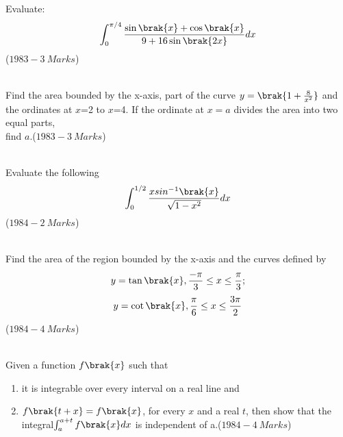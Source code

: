 \iffalse
  \title{Assignment}
  \author{Satyanarayana Gajjarapu}
  \section{subjective}
\fi

    \item Evaluate:\begin{align*}
         \int_{0}^{\pi/4}\frac{\sin{\brak{x}}+\cos{\brak{x}}}{9+16\sin{\brak{2x}}}dx\end{align*} \hfill($1983-3\ Marks$)\\\\
	 \item Find the area bounded by the x-axis, part of the curve $y=\brak{1+\frac{8}{x^2}}$ and the ordinates at $x$=2 to $x$=4. If the ordinate at $x=a$ divides the area into two equal parts,\\ find $a$.\hfill($1983-3\ Marks$)\\\\
	 \item Evaluate the following\begin{align*}
	     \int_{0}^{1/2}\frac{xsin^-{}^1\brak{x}}{\sqrt{1-x^2}}dx
	     \end{align*}\hfill($1984-2\ Marks$)\\\\
     \item Find the area of the region bounded by the x-axis and the curves defined by \begin{align*}y=\tan{\brak{x}}, \frac{-\pi}{3}\leq x \leq\frac{\pi}{3};\end{align*}\begin{align*}y=\cot{\brak{x}}, \frac{\pi}{6}\leq x \leq\frac{3\pi}{2}\end{align*}\hfill($1984-4\ Marks$)\\\\
	     \item Given a function $f\brak{x}$ such that
		     \begin{enumerate}
			     \item it is integrable over every interval on a real line and
		     \item $f\brak{t+x}=f\brak{x}$, for every $x$ and a real $t$, then show that the integral$\int_{a}^{a+t}f\brak{x} dx$ is independent of a.\hfill($1984-4\ Marks$)\\\\
		     \end{enumerate}
